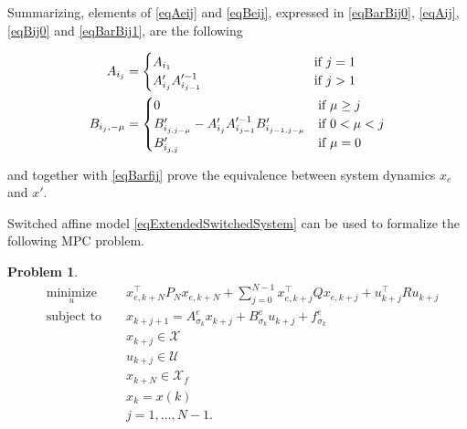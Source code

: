 \documentclass[letterpaper, 10 pt, conference]{ifacconf}  %
\newtheorem{problem}{Problem}
\begin{document}
\begin{pf}
	Summarizing, elements of \eqref{eqAeij} and \eqref{eqBeij}, expressed in \eqref{eqBarBij0}, \eqref{eqAij}, \eqref{eqBij0} and \eqref{eqBarBij1}, are the following
	
	\small
	\begin{align}
	A_{i_j} &=\begin{cases}
	A_{i_1} \kern 3.561cm &\mbox{if } j = 1\\
	A'_{i_j}A'^{-1}_{i_{j-1}}												    &\mbox{if } j > 1				
	\end{cases}\\
	\bar B_{i_j,-\mu} &=\begin{cases}
	0																&\mbox{if } \mu \geq j\\
	B'_{i_{j,j-\mu}} - A'_{i_j}A'^{-1}_{i_{j-1}}B'_{i_{j-1,j-\mu}} 	&\mbox{if } 0< \mu < j\\
	B'_{i_{j,j}}												    &\mbox{if } \mu = 0				
	\end{cases}
	\end{align}
	\normalsize
	
	and together with \eqref{eqBarfij} prove the equivalence between system dynamics $x_e$ and $x'$.
	
\end{pf}

Switched affine model \eqref{eqExtendedSwitchedSystem} can be used to formalize the following MPC problem.
\begin{problem}\label{pbMPC-SA}
\small
\begin{equation*}
\begin{aligned}
& \underset{u}{\text{minimize}} & &  x_{e,k+N}^\top P_N x_{e,k+N} + \sum_{j=0}^{N-1} x_{e,k+j}^\top Q x_{e,k+j} + u^\top_{k+j} R u_{k+j}  \\
& \text{subject to }            & &  x_{k+j+1}  =   A^e_{\sigma_k} x_{k+j}+B^e_{\sigma_k} u_{k+j}+f^e_{\sigma_k}                          \\
&                               & &  x_{k+j}   \in \mathcal{X}                                                                            \\
&                               & &  u_{k+j}   \in \mathcal{U}  																          \\
&                               & &  x_{k+N}   \in \mathcal{X}_f																		  \\
&                               & &  x_{k}      =   x(k)             									                                  \\
&                               & &  j          =   1,\ldots,N-1.                                                                         \\
\end{aligned}
\end{equation*}
\normalsize
\end{problem}
\end{document}
